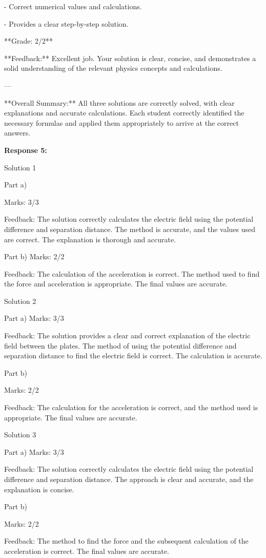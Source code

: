 \documentclass[a4paper,11pt]{article}
\begin{document}
- Correct numerical values and calculations.

- Provides a clear step-by-step solution.

**Grade: 2/2**

**Feedback:** Excellent job. Your solution is clear, concise, and demonstrates a solid understanding of the relevant physics concepts and calculations.

---

**Overall Summary:** All three solutions are correctly solved, with clear explanations and accurate calculations. Each student correctly identified the necessary formulas and applied them appropriately to arrive at the correct answers.

\bigskip
\textbf{Response 5:}

Solution 1

Part a)

Marks: 3/3

Feedback: The solution correctly calculates the electric field using the potential difference and separation distance. The method is accurate, and the values used are correct. The explanation is thorough and accurate.

Part b)
Marks: 2/2

Feedback: The calculation of the acceleration is correct. The method used to find the force and acceleration is appropriate. The final values are accurate.

Solution 2

Part a)
Marks: 3/3

Feedback: The solution provides a clear and correct explanation of the electric field between the plates. The method of using the potential difference and separation distance to find the electric field is correct. The calculation is accurate.

Part b)

Marks: 2/2

Feedback: The calculation for the acceleration is correct, and the method used is appropriate. The final values are accurate.

Solution 3

Part a)
Marks: 3/3

Feedback: The solution correctly calculates the electric field using the potential difference and separation distance. The approach is clear and accurate, and the explanation is concise.

Part b)

Marks: 2/2

Feedback: The method to find the force and the subsequent calculation of the acceleration is correct. The final values are accurate. 
\end{document}
